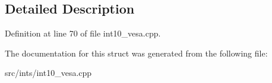 \subsection{Detailed Description}


Definition at line 70 of file int10\-\_\-vesa.\-cpp.



The documentation for this struct was generated from the following file\-:\begin{DoxyCompactItemize}
\item 
src/ints/int10\-\_\-vesa.\-cpp\end{DoxyCompactItemize}
